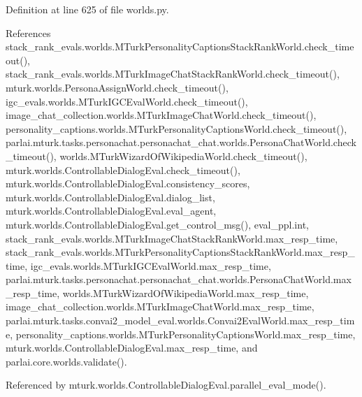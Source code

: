 Definition at line 625 of file worlds.\+py.



References stack\+\_\+rank\+\_\+evals.\+worlds.\+M\+Turk\+Personality\+Captions\+Stack\+Rank\+World.\+check\+\_\+timeout(), stack\+\_\+rank\+\_\+evals.\+worlds.\+M\+Turk\+Image\+Chat\+Stack\+Rank\+World.\+check\+\_\+timeout(), mturk.\+worlds.\+Persona\+Assign\+World.\+check\+\_\+timeout(), igc\+\_\+evals.\+worlds.\+M\+Turk\+I\+G\+C\+Eval\+World.\+check\+\_\+timeout(), image\+\_\+chat\+\_\+collection.\+worlds.\+M\+Turk\+Image\+Chat\+World.\+check\+\_\+timeout(), personality\+\_\+captions.\+worlds.\+M\+Turk\+Personality\+Captions\+World.\+check\+\_\+timeout(), parlai.\+mturk.\+tasks.\+personachat.\+personachat\+\_\+chat.\+worlds.\+Persona\+Chat\+World.\+check\+\_\+timeout(), worlds.\+M\+Turk\+Wizard\+Of\+Wikipedia\+World.\+check\+\_\+timeout(), mturk.\+worlds.\+Controllable\+Dialog\+Eval.\+check\+\_\+timeout(), mturk.\+worlds.\+Controllable\+Dialog\+Eval.\+consistency\+\_\+scores, mturk.\+worlds.\+Controllable\+Dialog\+Eval.\+dialog\+\_\+list, mturk.\+worlds.\+Controllable\+Dialog\+Eval.\+eval\+\_\+agent, mturk.\+worlds.\+Controllable\+Dialog\+Eval.\+get\+\_\+control\+\_\+msg(), eval\+\_\+ppl.\+int, stack\+\_\+rank\+\_\+evals.\+worlds.\+M\+Turk\+Image\+Chat\+Stack\+Rank\+World.\+max\+\_\+resp\+\_\+time, stack\+\_\+rank\+\_\+evals.\+worlds.\+M\+Turk\+Personality\+Captions\+Stack\+Rank\+World.\+max\+\_\+resp\+\_\+time, igc\+\_\+evals.\+worlds.\+M\+Turk\+I\+G\+C\+Eval\+World.\+max\+\_\+resp\+\_\+time, parlai.\+mturk.\+tasks.\+personachat.\+personachat\+\_\+chat.\+worlds.\+Persona\+Chat\+World.\+max\+\_\+resp\+\_\+time, worlds.\+M\+Turk\+Wizard\+Of\+Wikipedia\+World.\+max\+\_\+resp\+\_\+time, image\+\_\+chat\+\_\+collection.\+worlds.\+M\+Turk\+Image\+Chat\+World.\+max\+\_\+resp\+\_\+time, parlai.\+mturk.\+tasks.\+convai2\+\_\+model\+\_\+eval.\+worlds.\+Convai2\+Eval\+World.\+max\+\_\+resp\+\_\+time, personality\+\_\+captions.\+worlds.\+M\+Turk\+Personality\+Captions\+World.\+max\+\_\+resp\+\_\+time, mturk.\+worlds.\+Controllable\+Dialog\+Eval.\+max\+\_\+resp\+\_\+time, and parlai.\+core.\+worlds.\+validate().



Referenced by mturk.\+worlds.\+Controllable\+Dialog\+Eval.\+parallel\+\_\+eval\+\_\+mode().

